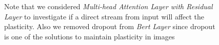\begin{figure}[htb!]
{Note that we considered \textit{Multi-head Attention Layer with Residual Layer} to investigate if a direct stream from input will affect the plasticity.
Also we removed dropout from \textit{Bert Layer} since dropout is one of the solutions to maintain plasticity in images~\cite{}




\begin{figure}[t]
    \centering
\end{figure}}
\end{figure}
